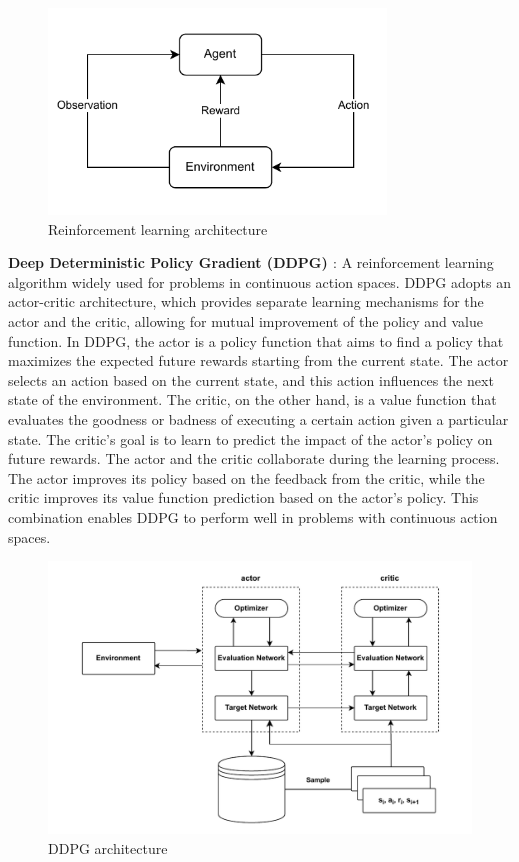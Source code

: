 \documentclass{PHlab-thesis}
\begin{document}
\begin{figure}[H]
    \centering 
    \includegraphics[width=0.8\textwidth]{images/RL architecture.pdf}
    \caption{Reinforcement learning architecture} 
    \label{Fig.Reinforcement learning architecture} 
\end{figure}

\textbf{Deep Deterministic Policy Gradient (DDPG) \cite{lillicrap2015continuous}}: A reinforcement learning algorithm widely used for problems in continuous action spaces. DDPG adopts an actor-critic architecture, which provides separate learning mechanisms for the actor and the critic, allowing for mutual improvement of the policy and value function. In DDPG, the actor is a policy function that aims to find a policy that maximizes the expected future rewards starting from the current state. The actor selects an action based on the current state, and this action influences the next state of the environment. The critic, on the other hand, is a value function that evaluates the goodness or badness of executing a certain action given a particular state. The critic's goal is to learn to predict the impact of the actor's policy on future rewards. The actor and the critic collaborate during the learning process. The actor improves its policy based on the feedback from the critic, while the critic improves its value function prediction based on the actor's policy. This combination enables DDPG to perform well in problems with continuous action spaces.

\begin{figure}[H]
    \centering 
    \includegraphics[width=\textwidth]{images/DDPG architecture.pdf}
    \caption{DDPG architecture} 
    \label{Fig.DDPG architecture} 
\end{figure}
\end{document}
